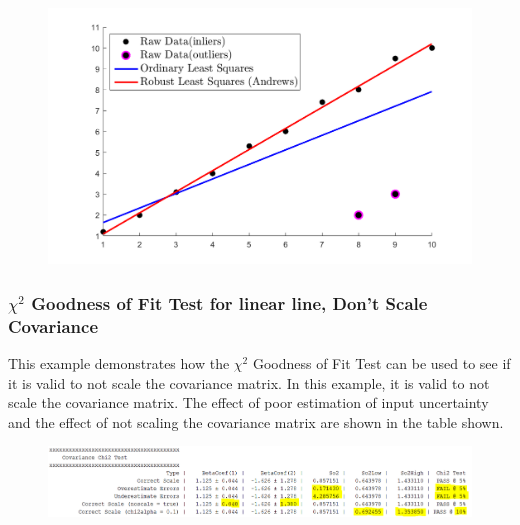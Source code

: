 \documentclass{article}
\begin{document}
	
	
	\begin{figure}[H]
		\centering
		\includegraphics[width = \linewidth]{robust}
	\end{figure}
	
	\clearpage
	
	\subsubsection*{$\chi^2$ Goodness of Fit Test for linear line, Don't Scale Covariance}
	This example demonstrates how the $\chi^2$ Goodness of Fit Test can be used to see if it is valid to not scale the covariance matrix.  In this example, it is valid to not scale the covariance matrix.  The effect of poor estimation of input uncertainty and the effect of not scaling the covariance matrix are shown in the table shown. 
	
	
	\begin{figure}[H]
		\centering
		\includegraphics[width = \linewidth]{chi2}
	\end{figure}
	
	\clearpage
\end{document}
